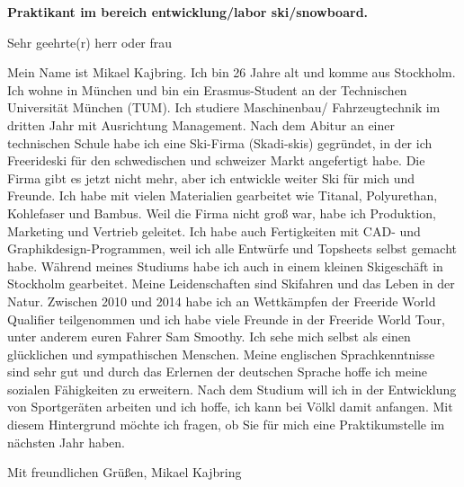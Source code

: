 \documentclass[paper=letter,fontsize=11pt]{scrartcl} %
\newcommand{\sepspace}{\vspace*{1em}}		%
\newcommand{\Textlong}[4]{
		\noindent \textbf{#1} \par
        \sepspace
        \noindent \small #2
        \par\sepspace      
		\noindent \small #3
        \par\sepspace      
		\noindent \small #4
        \normalsize \par}
\begin{document}
\Textlong{Praktikant im bereich entwicklung/labor ski/snowboard.}{Sehr geehrte(r) herr oder frau}{Mein Name ist Mikael Kajbring. Ich bin 26 Jahre alt und komme aus Stockholm. Ich wohne in München und bin ein Erasmus-Student an der Technischen Universität München (TUM). Ich studiere Maschinenbau/ Fahrzeugtechnik im dritten Jahr mit Ausrichtung Management. Nach dem Abitur an einer technischen Schule habe ich eine Ski-Firma (Skadi-skis) gegründet, in der ich Freerideski für den schwedischen und schweizer Markt angefertigt habe. Die Firma gibt es jetzt nicht mehr, aber ich entwickle weiter Ski für mich und Freunde. Ich habe mit vielen Materialien gearbeitet wie Titanal, Polyurethan, Kohlefaser und Bambus. Weil die Firma nicht groß war, habe ich Produktion, Marketing und Vertrieb geleitet. Ich habe auch Fertigkeiten mit CAD- und Graphikdesign-Programmen, weil ich alle Entwürfe und Topsheets selbst gemacht habe. Während meines Studiums habe ich auch in einem kleinen Skigeschäft in Stockholm gearbeitet. 
Meine Leidenschaften sind Skifahren und das Leben in der Natur. Zwischen 2010 und 2014 habe ich an Wettkämpfen der Freeride World Qualifier teilgenommen und ich habe viele Freunde in der Freeride World Tour, unter anderem euren Fahrer Sam Smoothy. 
Ich sehe mich selbst als einen glücklichen und sympathischen Menschen. Meine englischen Sprachkenntnisse sind sehr gut und durch das Erlernen der deutschen Sprache hoffe ich meine sozialen Fähigkeiten zu erweitern. Nach dem Studium will ich in der Entwicklung von Sportgeräten arbeiten und ich hoffe, ich kann bei Völkl damit anfangen.
Mit diesem Hintergrund möchte ich fragen, ob Sie für mich eine Praktikumstelle im nächsten Jahr haben.}{Mit freundlichen Grüßen, Mikael Kajbring}

\sepspace
\end{document}
